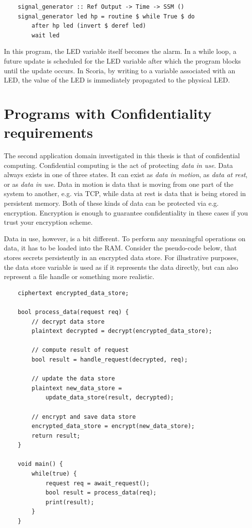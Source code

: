 \begin{verbatim}
    signal_generator :: Ref Output -> Time -> SSM ()
    signal_generator led hp = routine $ while True $ do
        after hp led (invert $ deref led)
        wait led
\end{verbatim}

In this program, the LED variable itself becomes the alarm. In a while loop, a future update is scheduled for the LED
variable after which the program blocks until the update occurs. In Scoria, by writing to a variable associated
with an LED, the value of the LED is immediately propagated to the physical LED.

\section{Programs with Confidentiality requirements}

The second application domain investigated in this thesis is that of confidential computing. Confidential computing is
the act of protecting \textit{data in use}.
Data always exists in one of three states. It can exist as \textit{data in motion}, as \textit{data at rest}, or as
\textit{data in use}. Data in motion is data that is moving from one part of the system to another, e.g. via TCP, while data at rest
is data that is being stored in persistent memory. Both of these kinds of data can be protected via e.g. encryption.
Encryption is enough to guarantee confidentiality in these cases if you trust your encryption scheme.

Data in use, however, is a bit different. To perform any meaningful operations on data, it has to be loaded into the RAM.
Consider the pseudo-code below, that stores secrets persistently in an encrypted data store. For illustrative purposes, the
data store variable is used as if it represents the data directly, but can also represent a file handle or something more
realistic.

\begin{verbatim}
    ciphertext encrypted_data_store;

    bool process_data(request req) {
        // decrypt data store
        plaintext decrypted = decrypt(encrypted_data_store);

        // compute result of request
        bool result = handle_request(decrypted, req);

        // update the data store
        plaintext new_data_store =
            update_data_store(result, decrypted);

        // encrypt and save data store
        encrypted_data_store = encrypt(new_data_store);
        return result;
    }

    void main() {
        while(true) {
            request req = await_request();
            bool result = process_data(req);
            print(result);
        }
    }
\end{verbatim}

